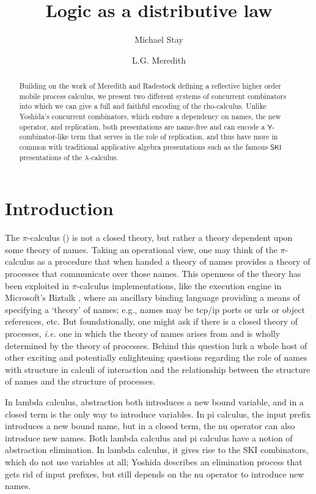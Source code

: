 \documentclass{llncs}
\title{Logic as a distributive law}
\author{
Michael Stay\inst{1}\\
\and
L.G. Meredith\inst{2}\\
}
\institute{
  {Pyrofex Corp.}\\
  \email{\fontsize{8}{8}\selectfont stay@pyrofex.net}\\
  \and
  {RChain Cooperative}\\
  \email{\fontsize{8}{8}\selectfont greg@rchain.coop}
}
\newcommand{\pic}{$\pi$-calculus}
\begin{document}
\maketitle
\begin{abstract}
\noindent
  Building on the work of Meredith and Radestock
  \cite{DBLP:journals/entcs/MeredithR05} defining a reflective higher
  order mobile process calculus, we present two different systems of
  concurrent combinators into which we can give a full and faithful
  encoding of the rho-calculus. Unlike Yoshida's concurrent
  combinators, which endure a dependency on names, the new operator,
  and replication, both presentations are name-free and can encode a
  $\mathsf{Y}$-combinator-like term that serves in the role of
  replication, and thus have more in common with traditional
  applicative algebra presentations such as the famous $\mathsf{SKI}$
  presentations of the $\lambda$-calculus.

\end{abstract}
\section{Introduction}
  
  The {\pic} (\cite{milner91polyadicpi}) is not a closed theory, but
rather a theory dependent upon some theory of names. Taking an
operational view, one may think of the {\pic} as a procedure that when
handed a theory of names provides a theory of processes that
communicate over those names. This openness of the theory has been
exploited in {\pic} implementations, like the execution engine in
Microsoft's Biztalk \cite{biztalk}, where an ancillary binding
language providing a means of specifying a `theory' of names; e.g.,
names may be tcp/ip ports or urls or object references, etc. But
foundationally, one might ask if there is a closed theory of
processes, {\em i.e.} one in which the theory of names arises from and is
wholly determined by the theory of processes. Behind this question
lurk a whole host of other exciting and potentially enlightening
questions regarding the role of names with structure in calculi of
interaction and the relationship between the structure of names and
the structure of processes.

In lambda calculus, abstraction both introduces a new bound variable, and in a closed term is the only way to introduce variables.  In pi calculus, the input prefix introduces a new bound name, but in a closed term, the nu operator can also introduce new names.  Both lambda calculus and pi calculus have a notion of abstraction elimination.  In lambda calculus, it gives rise to the SKI combinators, which do not use variables at all;  Yoshida \cite{Yoshida} describes an elimination process that gets rid of input prefixes, but still depends on the nu operator to introduce new names.
\end{document}
